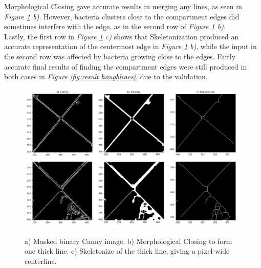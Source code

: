 \noindent Morphological Closing gave accurate results in merging any lines, as seen in \textit{Figure \ref{fig:result skeletonize} b)}. However, bacteria clusters close to the compartment edges did sometimes interfere with the edge, as in the second row of \textit{Figure \ref{fig:result skeletonize} b)}. \\

\noindent Lastly, the first row in \textit{Figure \ref{fig:result skeletonize} c)} shows that Skeletonization produced an accurate representation of the centermost edge in \textit{Figure \ref{fig:result skeletonize} b)}, while the input in the second row was affected by bacteria growing close to the edges. Fairly accurate final results of finding the compartment edges were still produced in both cases in \textit{Figure \ref{fig:result houghlines}}, due to the validation.

\begin{figure}[H]
    \centering
      \includegraphics[width=1\linewidth]{figures/PDF/Skeletonize_double.pdf}\\
    \caption{a) Masked binary Canny image. b) Morphological Closing to form one thick line. c) Skeletonize of the thick line, giving a pixel-wide centerline.}
    \label{fig:result skeletonize}
\end{figure}


